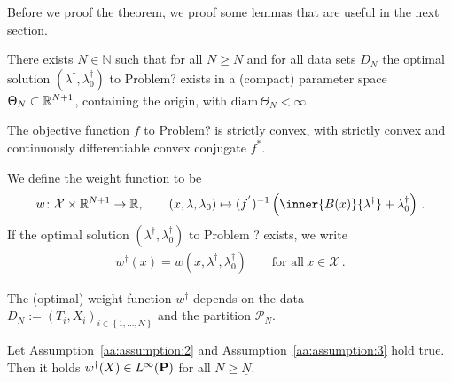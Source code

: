 Before we proof the theorem, we proof some lemmas that are useful in the next section.


\begin{assumption}
  \label{aa:assumption:2}
  There exists $\underline{N}\in\mathbb{N}$ such that 
  for all $N\ge \underline{N}$ and for all data sets $D_N$
  the optimal solution
  $(\lambda^\dagger,\lambda_0^\dagger)$
  to Problem? exists in a (compact) parameter space 
  $\Theta_N\subset \R^{N+1}$, containing the origin, with
  $\mathrm{diam}\,\Theta_N<\infty$.
\end{assumption}

\begin{assumption}
  \label{aa:assumption:3}
  The objective function $f$ to Problem? is strictly convex, with strictly convex and continuously differentiable convex conjugate $f^*$. 
\end{assumption}
\begin{definition}
  We define the weight function to be
\begin{gather*}
  w
  \colon
  \mathcal{X}
  \times
  \R^{N+1}
  \to
  \R
  ,\qquad
  \left( 
  x
  ,
  \lambda
  ,
  \lambda_0
  \right)
  \mapsto
    (
    f^{'}
    )^{-1}
    \left( 
      \inner{B(x)}{\lambda^\dagger}
      +
      \lambda_0^\dagger
    \right)
    \,.
\end{gather*}
If 
  the optimal solution
  $(\lambda^\dagger,\lambda_0^\dagger)$
  to Problem ? exists, we write
  \begin{gather*}
    w^\dagger(x)
    =
    w(x,\lambda^\dagger,\lambda^\dagger_0)
    \qquad
    \text{for all}\ 
    x\in\mathcal{X}\,.
  \end{gather*}
\end{definition}
\begin{remark}
  The (optimal) weight function $w^\dagger$ depends on the data
  $D_N:=
  (T_i,X_i)_{i\in \left\{ 1,\ldots,N \right\}}$
  and the partition $\mathcal{P}_N$.
\end{remark}
\begin{lemma}
  \label{weights_bounded}
  Let Assumption~\ref{aa:assumption:2} and Assumption~\ref{aa:assumption:3} hold true.
  Then it holds 
  $
  w^\dagger(X)\in L^\infty(\P)
  $ for all $N\ge \underline{N}$.
\end{lemma}
